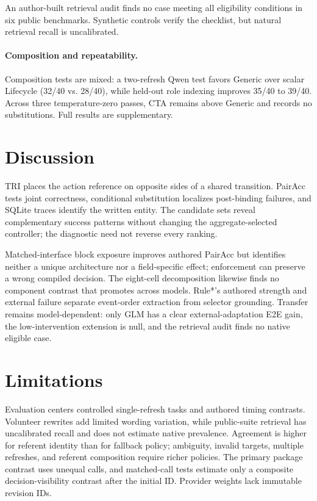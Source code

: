\documentclass[letterpaper]{article}
\begin{document}
An author-built retrieval audit finds no case meeting all eligibility conditions in six public
benchmarks. Synthetic controls verify the checklist, but natural retrieval recall is uncalibrated.

\paragraph{Composition and repeatability.}
Composition tests are mixed: a two-refresh Qwen test favors Generic over scalar Lifecycle (32/40
vs. 28/40), while held-out role indexing improves 35/40 to 39/40. Across three temperature-zero
passes, CTA remains above Generic and records no substitutions. Full results are supplementary.

\section{Discussion}

TRI places the action reference on opposite sides of a shared transition. PairAcc tests joint
correctness, conditional substitution localizes post-binding failures, and SQLite traces identify
the written entity. The candidate sets reveal complementary success patterns without changing the
aggregate-selected controller; the diagnostic need not reverse every ranking.

Matched-interface block exposure improves authored PairAcc but identifies neither a unique
architecture nor a field-specific effect; enforcement can preserve a wrong compiled decision.
The eight-cell decomposition likewise finds no component contrast that promotes across models.
Rule*'s authored strength and external failure separate event-order extraction from selector
grounding. Transfer remains model-dependent: only GLM has a clear external-adaptation E2E gain,
the low-intervention extension is null, and the retrieval audit finds no native eligible case.

\section{Limitations}

Evaluation centers controlled single-refresh tasks and authored timing contrasts. Volunteer
rewrites add limited wording variation, while public-suite retrieval has uncalibrated recall and
does not estimate native prevalence. Agreement is higher for referent identity than for fallback
policy; ambiguity, invalid targets, multiple refreshes, and referent composition require richer
policies. The primary package contrast uses unequal calls, and matched-call tests estimate only a
composite decision-visibility contrast after the initial ID. Provider weights lack immutable
revision IDs.
\end{document}
